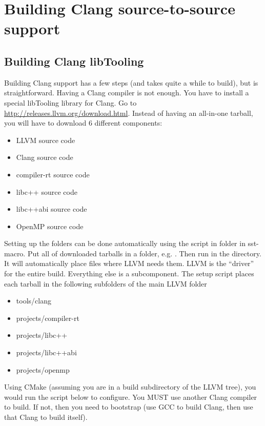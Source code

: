 \section{Building Clang source-to-source support}
\label{sec:buildingClang}

\subsection{Building Clang libTooling}

Building Clang support has a few steps (and takes quite a while to build), but is straightforward.
Having a Clang compiler is not enough. You have to install a special libTooling library for Clang.
Go to \url{http://releases.llvm.org/download.html}. Instead of having an all-in-one tarball, you will have to download 6 different components:

\begin{itemize}
\item LLVM source code
\item Clang source code
\item compiler-rt source code
\item libc++ source code
\item libc++abi source code
\item OpenMP source code
\end{itemize}

Setting up the folders can be done automatically using the  script in  folder in sst-macro. Put all of downloaded tarballs in a folder, e.g. . Then run  in the directory. 
It will automatically place files where LLVM needs them.
LLVM is the ``driver'' for the entire build. Everything else is a subcomponent. 
The setup script places each tarball in the following subfolders of the main LLVM folder

\begin{itemize}
\item tools/clang
\item projects/compiler-rt
\item projects/libc++
\item projects/libc++abi
\item projects/openmp
\end{itemize}

Using CMake (assuming you are in a build subdirectory of the LLVM tree), you would run the script below to configure.
You MUST use another Clang compiler to build. If not, then you need to bootstrap (use GCC to build Clang, then use that Clang to build itself).


